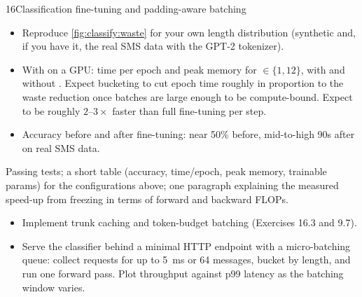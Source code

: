 \begin{labbox}{16}{Classification fine-tuning and padding-aware batching}
\begin{itemize}
\item Reproduce \cref{fig:classify:waste} for your own length distribution (synthetic
and, if you have it, the real SMS data with the GPT-2 tokenizer).
\item With  on a GPU: time per epoch and peak memory for
$\in\{1,12\}$, with and without . Expect
bucketing to cut epoch time roughly in proportion to the waste reduction once batches
are large enough to be compute-bound. Expect  to be
roughly $2$--$3\times$ faster than full fine-tuning per step.
\item Accuracy before and after fine-tuning: near 50\% before, mid-to-high 90s after on
real SMS data.
\end{itemize}

Passing tests; a short table (accuracy, time/epoch, peak memory, trainable params) for
the configurations above; one paragraph explaining the measured speed-up from freezing
in terms of forward and backward FLOPs.

\begin{itemize}
\item Implement trunk caching and token-budget batching (Exercises 16.3 and 9.7).
\item Serve the classifier behind a minimal HTTP endpoint with a micro-batching queue:
collect requests for up to \SI{5}{ms} or 64 messages, bucket by length, and run one
forward pass. Plot throughput against p99 latency as the batching window varies.
\end{itemize}
\end{labbox}

